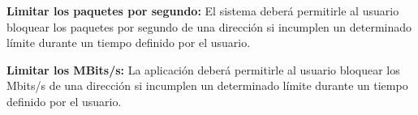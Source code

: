 \begin{functional}
        \setcounter{enumi}{12}
        \item \textbf{Limitar los paquetes por segundo:} El sistema deberá permitirle al usuario bloquear los paquetes por segundo de una dirección si incumplen un determinado límite durante un tiempo definido por el usuario.
        \item \textbf{Limitar los MBits/s:} La aplicación deberá permitirle al usuario bloquear los Mbits/s de una dirección si incumplen un determinado límite durante un tiempo definido por el usuario.
\end{functional}

